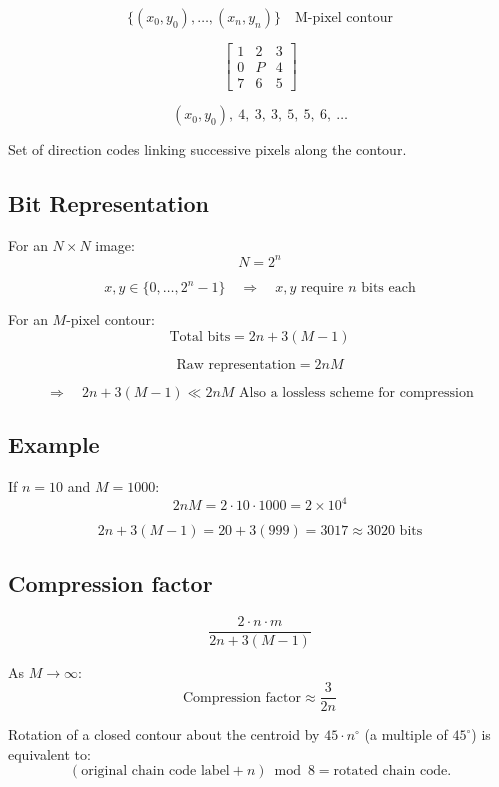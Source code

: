\documentclass[11pt]{article}
\theoremstyle{definition}
\begin{document}
\begin{equation}
\{(x_0, y_0), \ldots, (x_n, y_n)\} \quad \text{M-pixel contour}
\end{equation}

\[
\begin{bmatrix}
1 & 2 & 3 \\
0 & P & 4 \\
7 & 6 & 5
\end{bmatrix}
\]

\[
(x_0, y_0),\ 4,\ 3,\ 3,\ 5,\ 5,\ 6,\ \ldots
\]

Set of direction codes linking successive pixels along the contour.

\subsection*{Bit Representation}

For an $N \times N$ image:
\[
N = 2^n
\]

\[
x, y \in \{0, \ldots, 2^n - 1\} \quad \Rightarrow \quad x, y \text{ require } n \text{ bits each}
\]

For an $M$-pixel contour:
\[
\text{Total bits} = 2n + 3(M - 1)
\]

\[
\text{Raw representation} = 2 n M
\]

\[
\Rightarrow \quad 2n + 3(M - 1) \ll 2 n M \text{ Also a lossless scheme for compression}
\]

\subsection*{Example}

If $n = 10$ and $M = 1000$:
\[
2nM = 2 \cdot 10 \cdot 1000 = 2 \times 10^4
\]

\[
2n + 3(M - 1) = 20 + 3(999) = 3017 \approx 3020 \text{ bits}
\]

\subsection*{Compression factor}

\[
\frac{2\cdot n\cdot m}{2n + 3(M-1)}
\]

As $M \to \infty$:
\[
\text{Compression factor} \approx \frac{3}{2n}
\]

Rotation of a closed contour about the centroid by $45 \cdot n^\circ$ (a multiple of $45^\circ$) is equivalent to:
\[
(\text{original chain code label} + n) \bmod 8 = \text{rotated chain code}.
\]
\end{document}
